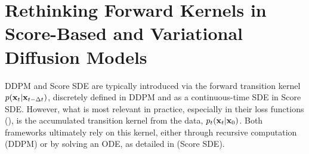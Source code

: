 
\clearpage
\newpage


\section{\texorpdfstring{Rethinking Forward Kernels in Score-Based and Variational Diffusion Models}{Rethinking Forward Kernels in Score-Based and Variational Diffusion Models}}\label{sec:variational-perspective}


DDPM and Score SDE are typically introduced via the forward transition kernel $ p({\mathbf{x}}_t|{\mathbf{x}}_{t-\Delta t}) $, discretely defined in DDPM and as a continuous-time SDE in Score SDE. However, what is most relevant in practice, especially in their loss functions (), is the accumulated transition kernel from the data, $ p_t({\mathbf{x}}_t|{\mathbf{x}}_0) $. Both frameworks ultimately rely on this kernel, either through recursive computation (DDPM) or by solving an ODE, as detailed in  (Score SDE).

